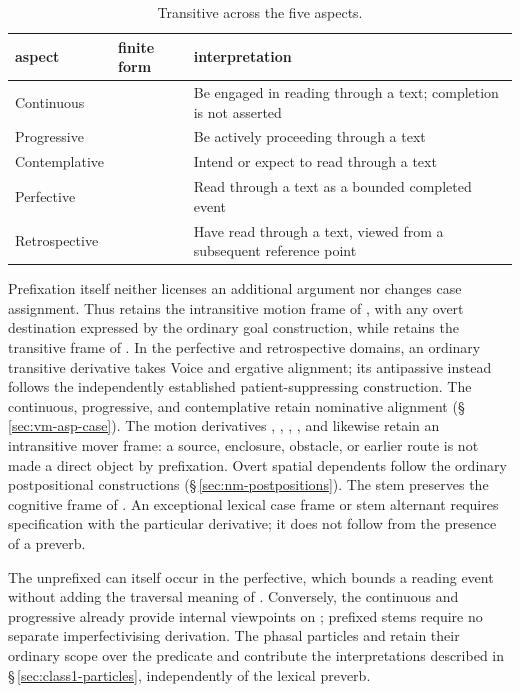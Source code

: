 \begin{table}[htbp]
  \footnotesize
  \caption{Transitive  across the five aspects.}\label{tab:preverb-aspect}
  \begin{tabularx}{\textwidth}{l l L}
    \toprule
    {\sc aspect} & {\sc finite form} & {\sc interpretation} \\
    \midrule
    Continuous &  & Be engaged in reading through a text; completion is not asserted \\
    Progressive &  & Be actively proceeding through a text \\
    Contemplative &  & Intend or expect to read through a text \\
    Perfective &  & Read through a text as a bounded completed event \\
    Retrospective &  & Have read through a text, viewed from a subsequent reference point \\
    \bottomrule
  \end{tabularx}
\end{table}

Prefixation itself neither licenses an additional argument nor changes case
assignment. Thus  retains the intransitive motion frame of
, with any overt destination expressed by the ordinary goal
construction, while  retains the transitive frame of
. In the perfective and retrospective domains, an ordinary
transitive derivative takes Voice  and ergative alignment; its
antipassive instead follows the independently established patient-suppressing
construction. The continuous, progressive, and contemplative retain nominative
alignment (§\,\ref{sec:vm-asp-case}). The motion derivatives ,
,
, , and  likewise retain
an intransitive mover frame: a source, enclosure, obstacle, or earlier route
is not made a direct object by prefixation. Overt spatial dependents follow
the ordinary postpositional constructions (§\,\ref{sec:nm-postpositions}).
The stem  preserves the cognitive frame of . An exceptional
lexical case frame or stem alternant requires specification with the particular
derivative; it does not follow from the presence of a preverb.

The unprefixed  can itself occur in the perfective, which bounds
a reading event without adding the traversal meaning of .
Conversely, the continuous and progressive already provide internal viewpoints
on ; prefixed stems require no separate imperfectivising
derivation. The phasal particles  and  retain their ordinary
scope over the predicate and contribute the interpretations described in
§\,\ref{sec:class1-particles}, independently of the lexical preverb.

